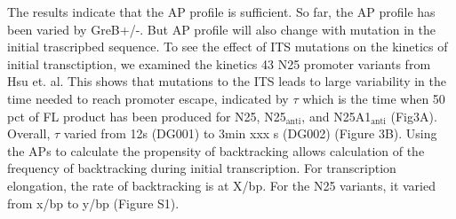 The results indicate that the AP profile is sufficient. So far, the AP profile
has been varied by GreB+/-. But AP profile will also change with mutation in
the initial trascripbed sequence. To see the effect of ITS mutations on the
kinetics of initial transctiption, we examined the kinetics 43 N25 promoter
variants from Hsu et. al. This shows that mutations to the ITS leads to large
variability in the time needed to reach promoter escape, indicated by $\tau$
which is the time when 50 pct of FL product has been produced for N25,
N25$_{\text{anti}}$, and N25A1$_{\text{anti}}$ (Fig3A). Overall, $\tau$ varied
from 12s (DG001) to 3min xxx s (DG002) (Figure 3B). Using the APs to calculate
the propensity of backtracking allows calculation of the frequency of
backtracking during initial transcription. For transcription elongation, the
rate of backtracking is at X/bp. For the N25 variants, it varied from x/bp to
y/bp (Figure S1).
